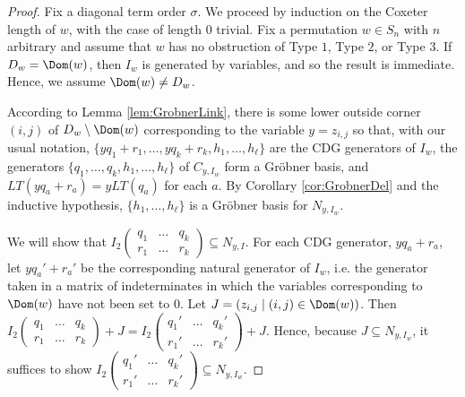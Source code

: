 \begin{proof}
Fix a diagonal term order $\sigma$.  We proceed by induction on the Coxeter length of $w$, with the case of length $0$ trivial.  Fix a permutation $w \in S_n$ with $n$ arbitrary and assume that $w$ has no obstruction of Type $1$, Type  $2$, or Type $3$.  If $D_w = \Dom(w)$, then $I_w$ is generated by variables, and so the result is immediate.  Hence, we assume $\Dom(w) \neq D_w$.

According to Lemma \ref{lem:GrobnerLink}, there is some lower outside corner $(i,j)$ of $D_w \setminus \Dom(w)$ corresponding to the variable $y = z_{i,j}$ so that, with our usual notation, $\{yq_1+r_1,\dots, yq_k+r_k,h_1,\dots, h_\ell\}$ are the CDG generators of $I_w$, the generators $\{q_1, \ldots, q_k, h_1, \ldots, h_\ell\}$ of $C_{y,I_w}$ form a Gr\"obner basis, and $LT(yq_a+r_a) = yLT(q_a)$ for each $a$.  By Corollary \ref{cor:GrobnerDel} and the inductive hypothesis, $\{h_1, \ldots, h_\ell\}$ is a Gr\"obner basis for $N_{y,I_w}$.  

We will show that $I_2 \begin{pmatrix} q_1 & \ldots & q_k \\ r_1 & \ldots & r_k \end{pmatrix} \subseteq  N_{y,I}$.  For each CDG generator, $yq_a+r_a$, let $yq_a'+r_a'$ be the corresponding natural generator of $I_w$, i.e. the generator taken in a matrix of indeterminates in which the variables corresponding to $\Dom(w)$ have not been set to $0$.  Let $J = (z_{i,j} \mid (i,j) \in \Dom(w))$.  Then $I_2 \begin{pmatrix} q_1 & \ldots & q_k \\ r_1 & \ldots & r_k \end{pmatrix}+J= I_2 \begin{pmatrix} q_1' & \ldots & q_k' \\ r_1' & \ldots & r_k' \end{pmatrix}+J$.  Hence, because $J \subseteq N_{y,I_w}$, it suffices to show $I_2 \begin{pmatrix} q_1' & \ldots & q_k' \\ r_1' & \ldots & r_k' \end{pmatrix} \subseteq N_{y,I_w}$.  


\end{proof}
